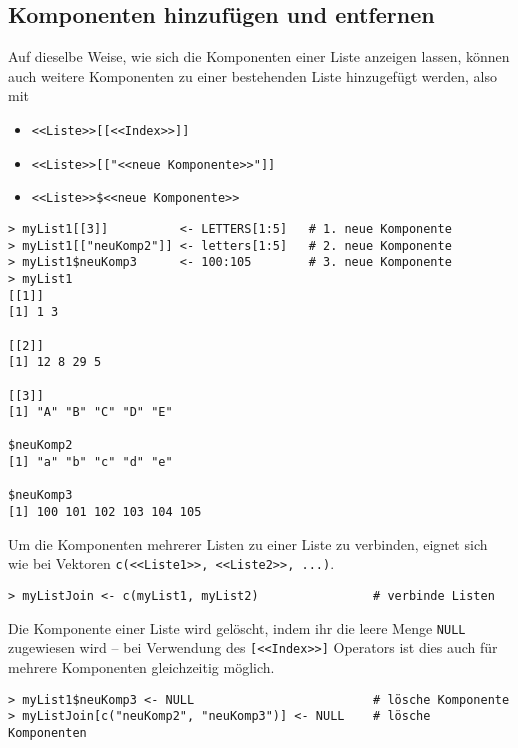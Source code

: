 \subsection{Komponenten hinzufügen und entfernen}
\label{sec:addRemove}

Auf dieselbe Weise, wie sich die Komponenten einer Liste anzeigen lassen, können auch weitere Komponenten zu einer bestehenden Liste hinzugefügt werden, also mit
\begin{itemize}
\item \lstinline!<<Liste>>[[<<Index>>]]!
\item \lstinline!<<Liste>>[["<<neue Komponente>>"]]!
\item \lstinline!<<Liste>>$<<neue Komponente>>!
\end{itemize}

\begin{lstlisting}
> myList1[[3]]          <- LETTERS[1:5]   # 1. neue Komponente
> myList1[["neuKomp2"]] <- letters[1:5]   # 2. neue Komponente
> myList1$neuKomp3      <- 100:105        # 3. neue Komponente
> myList1
[[1]]
[1] 1 3

[[2]]
[1] 12 8 29 5

[[3]]
[1] "A" "B" "C" "D" "E"

$neuKomp2
[1] "a" "b" "c" "d" "e"

$neuKomp3
[1] 100 101 102 103 104 105
\end{lstlisting}

Um die Komponenten mehrerer Listen zu einer Liste zu verbinden, eignet sich wie bei Vektoren \lstinline!c(<<Liste1>>, <<Liste2>>, ...)!.
\begin{lstlisting}
> myListJoin <- c(myList1, myList2)                # verbinde Listen
\end{lstlisting}

Die Komponente einer Liste wird gelöscht, indem ihr die leere Menge \lstinline!NULL! zugewiesen wird -- bei Verwendung des \lstinline![<<Index>>]! Operators ist dies auch für mehrere Komponenten gleichzeitig möglich.
\begin{lstlisting}
> myList1$neuKomp3 <- NULL                         # lösche Komponente
> myListJoin[c("neuKomp2", "neuKomp3")] <- NULL    # lösche Komponenten
\end{lstlisting}

